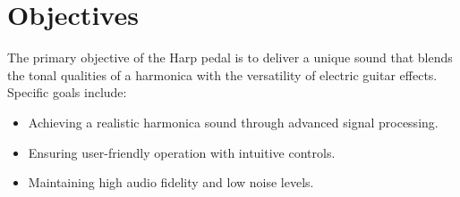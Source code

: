 \chapter{Objectives}

The primary objective of the Harp pedal is to deliver a unique sound that blends the tonal qualities of a harmonica with the versatility of electric guitar effects. Specific goals include:
\begin{itemize}
\item Achieving a realistic harmonica sound through advanced signal processing.
\item Ensuring user-friendly operation with intuitive controls.
\item Maintaining high audio fidelity and low noise levels.
\end{itemize}
